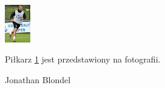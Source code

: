 \documentclass[a4paper,12pt]{article}
\begin{document}
\begin{figure}
\centering
\includegraphics[width=0.1\textwidth,natwidth=165,natheight=240]{fotki/fotka.jpg}
\caption{Jonathan Blondel}
\label{fig:Jonathan Blondel}
Piłkarz \ref{fig:Jonathan Blondel} jest przedstawiony na fotografii.
\end{figure}
\end{document}
